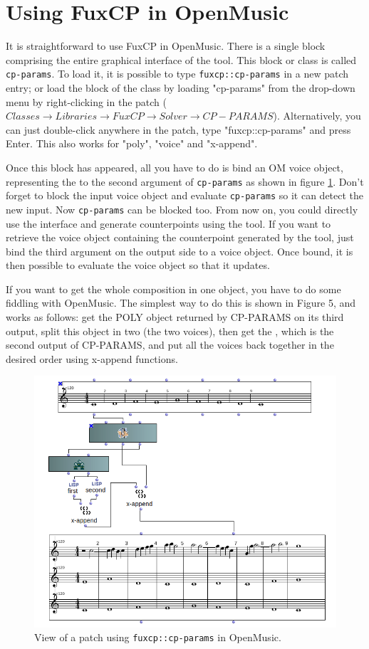 \section{Using FuxCP in OpenMusic}
It is straightforward to use FuxCP in OpenMusic. There is a single block comprising the entire graphical interface of the tool. This block or class is called \texttt{cp-params}. To load it, it is possible to type \texttt{fuxcp::cp-params} in a new patch entry; or load the block of the class by loading "cp-params" from the drop-down menu by right-clicking in the patch ($Classes\to Libraries\to FuxCP\to Solver\to CP-PARAMS$). Alternatively, you can just double-click anywhere in the patch, type "fuxcp::cp-params" and press Enter. This also works for "poly", "voice" and "x-append".

Once this block has appeared, all you have to do is bind an OM voice object, representing the \cfcomma to the second argument of \texttt{cp-params} as shown in figure \ref{fig:om_ext_interface_mod}. Don't forget to block the input voice object and evaluate \texttt{cp-params} so it can detect the new input. Now \texttt{cp-params} can be blocked too. From now on, you could directly use the interface and generate counterpoints using the tool. If you want to retrieve the voice object containing the counterpoint generated by the tool, just bind the third argument on the output side to a voice object. Once bound, it is then possible to evaluate the voice object so that it updates.

If you want to get the whole composition in one object, you have to do some fiddling with OpenMusic. The simplest way to do this is shown in Figure 5, and works as follows: get the POLY object returned by CP-PARAMS on its third output, split this object in two (the two voices), then get the \cfs, which is the second output of CP-PARAMS, and put all the voices back together in the desired order using x-append functions. 

\begin{figure}[h]
    \centering
    \includegraphics[width=5.2in]{Images/om_ext_interface_mod.png}
    \caption{View of a patch using \texttt{fuxcp::cp-params} in OpenMusic.}
    \label{fig:om_ext_interface_mod}
\end{figure}

